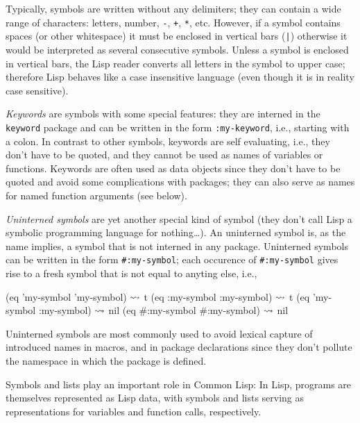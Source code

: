 \documentclass[a4paper]{amsart}
\begin{document}
Typically, symbols are written without any delimiters; they can
contain a wide range of characters: letters, number, \verb|-|,
\verb|+|, \verb|*|, etc. However, if a symbol contains spaces (or
other whitespace) it must be enclosed in vertical bars (\verb=|=)
otherwise it would be interpreted as several consecutive symbols.
Unless a symbol is enclosed in vertical bars, the Lisp reader converts
all letters in the symbol to upper case; therefore Lisp behaves like a
case insensitive language (even though it is in reality case
sensitive).

\emph{Keywords} are symbols with some special features: they are
interned in the \texttt{keyword} package and can be written in the
form \texttt{:my-keyword}, i.e., starting with a colon.  In contrast
to other symbols, keywords are self evaluating, i.e., they don't have
to be quoted, and they cannot be used as names of variables or
functions.  Keywords are often used as data objects since they don't
have to be quoted and avoid some complications with packages; they
can also serve as names for named function arguments (see below).

\emph{Uninterned symbols} are yet another special kind of symbol (they
don't call Lisp a symbolic programming language for nothing\dots).  An
uninterned symbol is, as the name implies, a symbol that is not
interned in any package.  Uninterned symbols can be written in the
form \verb|#:my-symbol|; each occurence of \verb|#:my-symbol| gives
rise to a fresh symbol that is not equal to anyting else, i.e.,
\begin{Code}
  (eq 'my-symbol 'my-symbol)      $\rightsquigarrow$ t
  (eq :my-symbol :my-symbol)      $\rightsquigarrow$ t  
  (eq 'my-symbol :my-symbol)      $\rightsquigarrow$ nil  
  (eq #:my-symbol #:my-symbol)    $\rightsquigarrow$ nil 
\end{Code}
Uninterned symbols are most commonly used to avoid lexical capture of
introduced names in macros, and in package declarations since they
don't pollute the namespace in which the package is defined.

Symbols and lists play an important role in Common Lisp: In Lisp,
programs are themselves represented as Lisp data, with symbols and
lists serving as representations for variables and function calls,
respectively.
\end{document}
